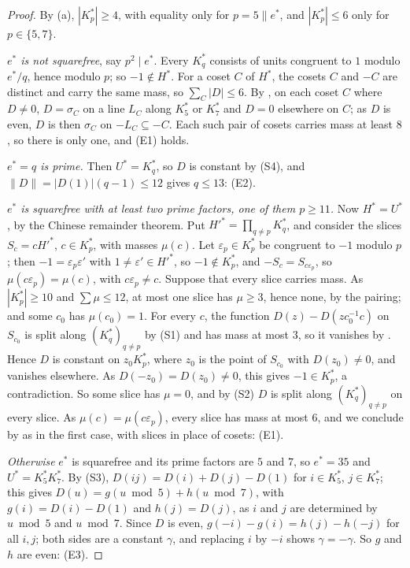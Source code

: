 \begin{proof}
By (a), $|K^{*}_{p}|\ge4$, with equality only for
$p=5\parallel e^{*}$, and $|K^{*}_{p}|\le6$ only for $p\in\{5,7\}$.

\emph{$e^{*}$ is not squarefree}, say $p^{2}\mid e^{*}$. Every $K^{*}_{q}$
consists of units congruent to $1$ modulo $e^{*}/q$, hence modulo $p$; so
$-1\notin H^{*}$. For a coset $C$ of $H^{*}$, the cosets $C$ and $-C$ are
distinct and carry the same mass, so $\sum_{C}|D|\le6$. By ,
on each coset $C$ where $D\ne0$, $D=\sigma_{C}$ on a line $L_{C}$ along
$K^{*}_{5}$ or $K^{*}_{7}$ and $D=0$ elsewhere on $C$; as $D$ is even, $D$
is then $\sigma_{C}$ on $-L_{C}\subseteq-C$. Each such pair of cosets carries
mass at least $8$, so there is only one, and (E1) holds.

\emph{$e^{*}=q$ is prime.} Then $U^{*}=K^{*}_{q}$, so $D$ is constant by
(S4), and $\|D\|=|D(1)|(q-1)\le12$ gives $q\le13$: (E2).

\emph{$e^{*}$ is squarefree with at least two prime factors, one of them
$p\ge11$.} Now $H^{*}=U^{*}$, by the Chinese remainder theorem. Put
$H'^{*}=\prod_{q\ne p}K^{*}_{q}$, and consider the slices $S_{c}=cH'^{*}$,
$c\in K^{*}_{p}$, with masses $\mu(c)$. Let $\varepsilon_{p}\in K^{*}_{p}$
be congruent to $-1$ modulo $p$; then $-1=\varepsilon_{p}\varepsilon'$ with
$1\ne\varepsilon'\in H'^{*}$, so $-1\notin K^{*}_{p}$, and
$-S_{c}=S_{c\varepsilon_{p}}$, so $\mu(c\varepsilon_{p})=\mu(c)$, with
$c\varepsilon_{p}\ne c$. Suppose that every slice carries mass. As
$|K^{*}_{p}|\ge10$ and $\sum\mu\le12$, at most one slice has $\mu\ge3$,
hence none, by the pairing; and some $c_{0}$ has $\mu(c_{0})=1$. For every
$c$, the function $D(z)-D(zc_{0}^{-1}c)$ on $S_{c_{0}}$ is split along
$(K^{*}_{q})_{q\ne p}$ by (S1) and has mass at most $3$, so it vanishes by
. Hence $D$ is constant on $z_{0}K^{*}_{p}$, where $z_{0}$ is
the point of $S_{c_{0}}$ with $D(z_{0})\ne0$, and vanishes elsewhere. As
$D(-z_{0})=D(z_{0})\ne0$, this gives $-1\in K^{*}_{p}$, a contradiction. So
some slice has $\mu=0$, and by (S2) $D$ is split along $(K^{*}_{q})_{q\ne p}$
on every slice. As $\mu(c)=\mu(c\varepsilon_{p})$, every slice has mass at
most $6$, and we conclude by  as in the first case, with
slices in place of cosets: (E1).

\emph{Otherwise} $e^{*}$ is squarefree and its prime factors are $5$ and
$7$, so $e^{*}=35$ and $U^{*}=K^{*}_{5}K^{*}_{7}$. By (S3),
$D(ij)=D(i)+D(j)-D(1)$ for $i\in K^{*}_{5}$, $j\in K^{*}_{7}$; this gives
$D(u)=g(u\bmod5)+h(u\bmod7)$, with $g(i)=D(i)-D(1)$ and $h(j)=D(j)$, as $i$
and $j$ are determined by $u\bmod5$ and $u\bmod7$. Since $D$ is even,
$g(-i)-g(i)=h(j)-h(-j)$ for all $i,j$; both sides are a constant $\gamma$,
and replacing $i$ by $-i$ shows $\gamma=-\gamma$. So $g$ and $h$ are even:
(E3).
\end{proof}

